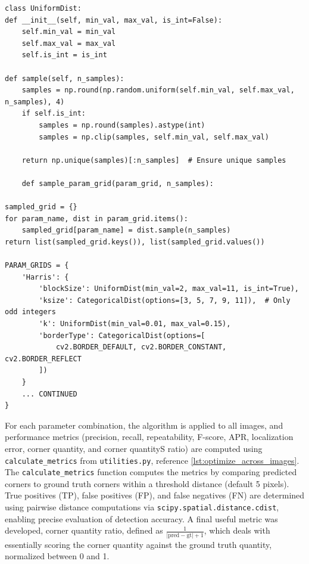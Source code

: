 \documentclass[journal]{IEEEtran}
\begin{document}
\begin{lstlisting}[style=python, caption={Distributions Example}, label={lst:uniform_dist}]
class UniformDist:
def __init__(self, min_val, max_val, is_int=False):
    self.min_val = min_val
    self.max_val = max_val
    self.is_int = is_int

def sample(self, n_samples):
    samples = np.round(np.random.uniform(self.min_val, self.max_val, n_samples), 4)
    if self.is_int:
        samples = np.round(samples).astype(int)
        samples = np.clip(samples, self.min_val, self.max_val)
        
    return np.unique(samples)[:n_samples]  # Ensure unique samples

    def sample_param_grid(param_grid, n_samples):

sampled_grid = {}
for param_name, dist in param_grid.items():
    sampled_grid[param_name] = dist.sample(n_samples)
return list(sampled_grid.keys()), list(sampled_grid.values())

PARAM_GRIDS = {
    'Harris': {
        'blockSize': UniformDist(min_val=2, max_val=11, is_int=True),
        'ksize': CategoricalDist(options=[3, 5, 7, 9, 11]),  # Only odd integers
        'k': UniformDist(min_val=0.01, max_val=0.15),
        'borderType': CategoricalDist(options=[
            cv2.BORDER_DEFAULT, cv2.BORDER_CONSTANT, cv2.BORDER_REFLECT
        ])
    }
    ... CONTINUED
}
\end{lstlisting}

For each parameter combination, the algorithm is applied to all images, and performance metrics (precision, recall, repeatability, F-score, APR, localization error, corner quantity, and corner quantityS ratio) are computed using \texttt{calculate\_metrics} from \texttt{utilities.py}, reference \cref{lst:optimize_across_images}. The \texttt{calculate\_metrics} function computes the metrics by comparing predicted corners to ground truth corners within a threshold distance (default 5 pixels). True positives (TP), false positives (FP), and false negatives (FN) are determined using pairwise distance computations via \texttt{scipy.spatial.distance.cdist}, enabling precise evaluation of detection accuracy. A final useful metric was developed, corner quantity ratio, defined as \( \frac{1}{|\text{pred} - \text{gt}| + 1} \), which deals with essentially scoring the corner quantity against the ground truth quantity, normalized between 0 and 1.\\
\end{document}

